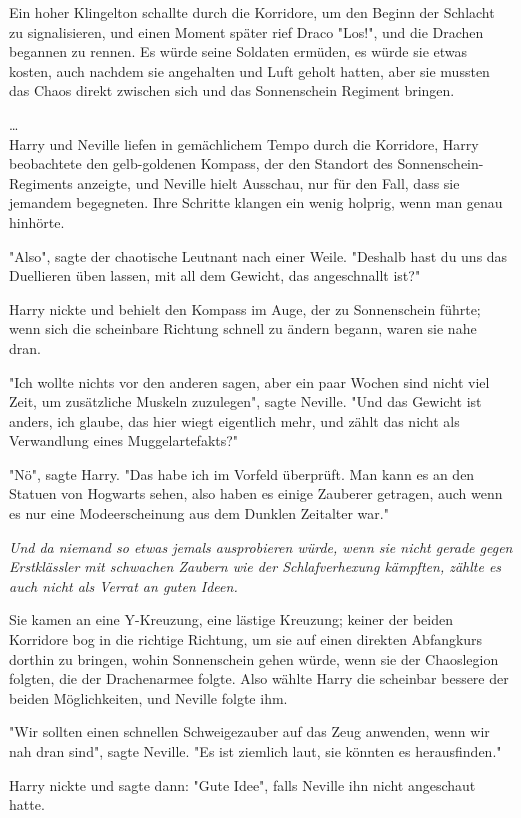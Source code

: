 {Ein hoher Klingelton schallte durch die Korridore, um den Beginn der Schlacht zu signalisieren, und einen Moment später rief Draco "Los!", und die Drachen begannen zu rennen. Es würde seine Soldaten ermüden, es würde sie etwas kosten, auch nachdem sie angehalten und Luft geholt hatten, aber sie mussten das Chaos direkt zwischen sich und das Sonnenschein Regiment bringen.

…\\ Harry und Neville liefen in gemächlichem Tempo durch die Korridore, Harry beobachtete den gelb-goldenen Kompass, der den Standort des Sonnenschein-Regiments anzeigte, und Neville hielt Ausschau, nur für den Fall, dass sie jemandem begegneten. Ihre Schritte klangen ein wenig holprig, wenn man genau hinhörte.

"Also", sagte der chaotische Leutnant nach einer Weile. "Deshalb hast du uns das Duellieren üben lassen, mit all dem Gewicht, das angeschnallt ist?"

Harry nickte und behielt den Kompass im Auge, der zu Sonnenschein führte; wenn sich die scheinbare Richtung schnell zu ändern begann, waren sie nahe dran.

"Ich wollte nichts vor den anderen sagen, aber ein paar Wochen sind nicht viel Zeit, um zusätzliche Muskeln zuzulegen", sagte Neville. "Und das Gewicht ist anders, ich glaube, das hier wiegt eigentlich mehr, und zählt das nicht als Verwandlung eines Muggelartefakts?"

"Nö", sagte Harry. "Das habe ich im Vorfeld überprüft. Man kann es an den Statuen von Hogwarts sehen, also haben es einige Zauberer getragen, auch wenn es nur eine Modeerscheinung aus dem Dunklen Zeitalter war."

\emph{Und da niemand so etwas jemals ausprobieren würde, wenn sie nicht gerade gegen Erstklässler mit schwachen Zaubern wie der Schlafverhexung kämpften, zählte es auch nicht als Verrat an guten Ideen.}

Sie kamen an eine Y-Kreuzung, eine lästige Kreuzung; keiner der beiden Korridore bog in die richtige Richtung, um sie auf einen direkten Abfangkurs dorthin zu bringen, wohin Sonnenschein gehen würde, wenn sie der Chaoslegion folgten, die der Drachenarmee folgte. Also wählte Harry die scheinbar bessere der beiden Möglichkeiten, und Neville folgte ihm.

"Wir sollten einen schnellen Schweigezauber auf das Zeug anwenden, wenn wir nah dran sind", sagte Neville. "Es ist ziemlich laut, sie könnten es herausfinden."

Harry nickte und sagte dann: "Gute Idee", falls Neville ihn nicht angeschaut hatte.

}
